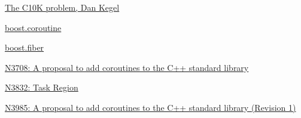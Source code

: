 \begin{thebibliography}{99}

        \href{http://www.kegel.com/c10k.html}
        {The C10K problem, Dan Kegel}

        \href{http://www.boost.org/doc/libs/1_55_0/libs/coroutine/doc/html/index.html}
        {boost.coroutine}

        \href{http://olk.github.io/libs/fiber/doc/html/}
        {boost.fiber}

        \href{http://www.open-std.org/jtc1/sc22/wg21/docs/papers/2013/n3708.pdf}
        {N3708: A proposal to add coroutines to the C++ standard library}

        \href{http://www.open-std.org/jtc1/sc22/wg21/docs/papers/2014/n3832.pdf}
        {N3832: Task Region} 

        \href{http://www.open-std.org/jtc1/sc22/wg21/docs/papers/2014/n3985.pdf}
        {N3985: A proposal to add coroutines to the C++ standard library (Revision 1)}

\end{thebibliography}
